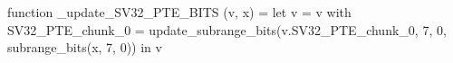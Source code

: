 function _update_SV32_PTE_BITS (v, x) = let v = { v with SV32_PTE_chunk_0 = update_subrange_bits(v.SV32_PTE_chunk_0, 7, 0, subrange_bits(x, 7, 0)) } in
  v
